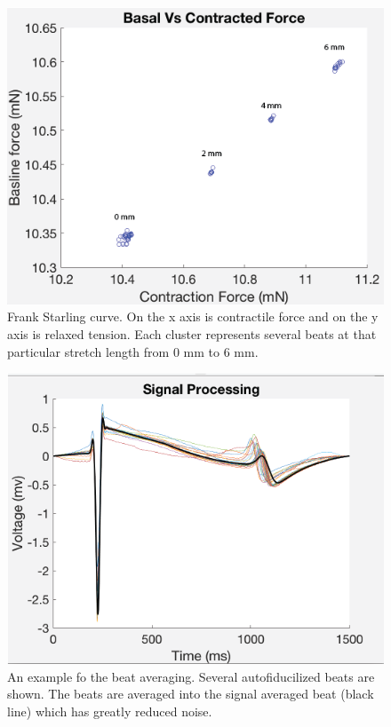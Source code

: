 \documentclass[12pt]{article}
\begin{document}

\begin{figure}[H]
	\label{fig:FSCurve}
	\centering
	\includegraphics[width = .95\textwidth]{Figures/FSCurve.png}
	\caption{Frank Starling curve. On the x axis is contractile force and on the y axis is relaxed tension. Each cluster represents several beats at that particular stretch length from 0 mm to 6 mm. }
\end{figure}



\begin{figure}[H]
	\label{fig:SignalProcessing}
	\centering
	\includegraphics[width = .95\textwidth]{Figures/SP.png}
	\caption{An example fo the beat averaging. Several autofiducilized beats are shown. The beats are averaged into the signal averaged beat (black line) which has greatly reduced noise. }
\end{figure}
\end{document}

